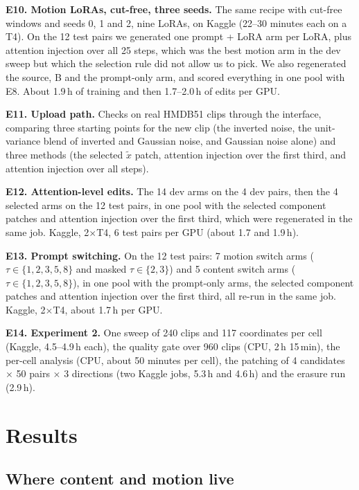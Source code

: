 \documentclass[twoside,english]{article}
\newcommand{\xd}{\tilde{x}}       %
\begin{document}
\textbf{E10. Motion LoRAs, cut-free, three seeds.} The same recipe with cut-free windows and seeds 0, 1
and 2, nine LoRAs, on Kaggle (22--30 minutes each on a T4). On the 12 test pairs we generated one prompt +
LoRA arm per LoRA, plus attention injection over all 25 steps, which was the best motion arm in the dev
sweep but which the selection rule did not allow us to pick. We also regenerated the source, B and the
prompt-only arm, and scored everything in one pool with E8. About 1.9\,h of training and then 1.7--2.0\,h of
edits per GPU.

\textbf{E11. Upload path.} Checks on real HMDB51 clips through the interface, comparing three starting
points for the new clip (the inverted noise, the unit-variance blend of inverted and Gaussian noise, and
Gaussian noise alone) and three methods (the selected $\xd$ patch, attention injection over the first
third, and attention injection over all steps).

\textbf{E12. Attention-level edits.} The 14 dev arms on the 4 dev pairs, then the 4 selected arms on the 12
test pairs, in one pool with the selected component patches and attention injection over the first
third, which were regenerated in the same job. Kaggle, 2$\times$T4, 6 test pairs per GPU (about 1.7 and 1.9\,h).

\textbf{E13. Prompt switching.} On the 12 test pairs: 7 motion switch arms ($\tau \in \{1,2,3,5,8\}$ and
masked $\tau \in \{2,3\}$) and 5 content switch arms ($\tau \in \{1,2,3,5,8\}$), in one pool with the
prompt-only arms, the selected component patches and attention injection over the first third, all
re-run in the same job. Kaggle, 2$\times$T4, about 1.7\,h per GPU.

\textbf{E14. Experiment 2.} One sweep of 240 clips and 117 coordinates per cell (Kaggle, 4.5--4.9\,h each),
the quality gate over 960 clips (CPU, 2\,h 15\,min), the per-cell analysis (CPU, about 50 minutes per
cell), the patching of 4 candidates $\times$ 50 pairs $\times$ 3 directions (two Kaggle jobs, 5.3\,h and
4.6\,h) and the erasure run (2.9\,h).

\section{Results}\label{sec:results}

\subsection{Where content and motion live}
\end{document}
